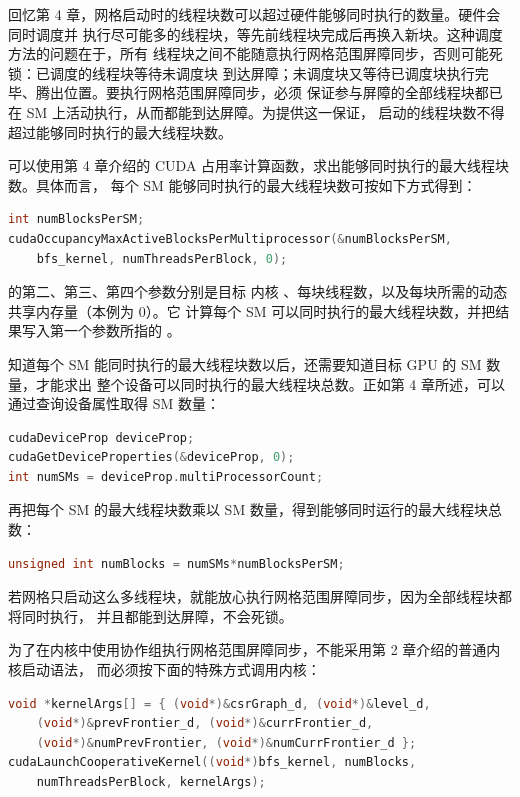 回忆第 4 章，网格启动时的线程块数可以超过硬件能够同时执行的数量。硬件会同时调度并
执行尽可能多的线程块，等先前线程块完成后再换入新块。这种调度方法的问题在于，所有
线程块之间不能随意执行网格范围屏障同步，否则可能死锁：已调度的线程块等待未调度块
到达屏障；未调度块又等待已调度块执行完毕、腾出位置。要执行网格范围屏障同步，必须
保证参与屏障的全部线程块都已在 SM 上活动执行，从而都能到达屏障。为提供这一保证，
启动的线程块数不得超过能够同时执行的最大线程块数。

可以使用第 4 章介绍的 CUDA 占用率计算函数，求出能够同时执行的最大线程块数。具体而言，
每个 SM 能够同时执行的最大线程块数可按如下方式得到：

\begin{lstlisting}[language=C++,numbers=none]
int numBlocksPerSM;
cudaOccupancyMaxActiveBlocksPerMultiprocessor(&numBlocksPerSM,
    bfs_kernel, numThreadsPerBlock, 0);
\end{lstlisting}

 的第二、第三、第四个参数分别是目标
内核 、每块线程数，以及每块所需的动态共享内存量（本例为 0）。它
计算每个 SM 可以同时执行的最大线程块数，并把结果写入第一个参数所指的
。

知道每个 SM 能同时执行的最大线程块数以后，还需要知道目标 GPU 的 SM 数量，才能求出
整个设备可以同时执行的最大线程块总数。正如第 4 章所述，可以通过查询设备属性取得
SM 数量：

\begin{lstlisting}[language=C++,numbers=none]
cudaDeviceProp deviceProp;
cudaGetDeviceProperties(&deviceProp, 0);
int numSMs = deviceProp.multiProcessorCount;
\end{lstlisting}

再把每个 SM 的最大线程块数乘以 SM 数量，得到能够同时运行的最大线程块总数：

\begin{lstlisting}[language=C++,numbers=none]
unsigned int numBlocks = numSMs*numBlocksPerSM;
\end{lstlisting}

若网格只启动这么多线程块，就能放心执行网格范围屏障同步，因为全部线程块都将同时执行，
并且都能到达屏障，不会死锁。

为了在内核中使用协作组执行网格范围屏障同步，不能采用第 2 章介绍的普通内核启动语法，
而必须按下面的特殊方式调用内核：

\begin{lstlisting}[language=C++,numbers=none]
void *kernelArgs[] = { (void*)&csrGraph_d, (void*)&level_d,
    (void*)&prevFrontier_d, (void*)&currFrontier_d,
    (void*)&numPrevFrontier, (void*)&numCurrFrontier_d };
cudaLaunchCooperativeKernel((void*)bfs_kernel, numBlocks,
    numThreadsPerBlock, kernelArgs);
\end{lstlisting}

